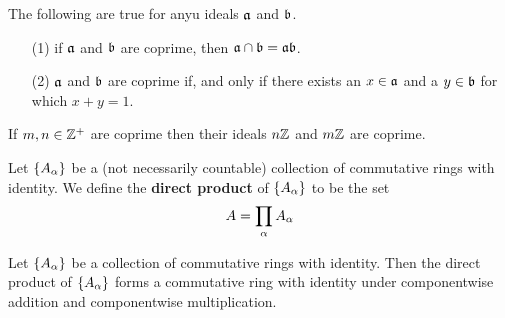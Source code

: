 \begin{lemma}\label{1.9.4}
    The following are true for anyu ideals $\af$ and  $\bf$.
    \begin{enumerate}
        \item[(1)] if $\af$ and $\bf$ are coprime, then $\af \cap \bf=\af\bf$.

        \item[(2)] $\af$ and  $\bf$ are coprime if, and only if there exists an
            $x \in \af$ and a $y \in \bf$ for which $x+y=1$.
    \end{enumerate}
\end{lemma}
\begin{corollary}
    If $m,n \in \Z^+$ are coprime then their ideals $n\Z$ and $m\Z$ are coprime.
\end{corollary}

\begin{definition}
    Let $\{A_\a\}$ be a (not necessarily countable) collection of commutative
    rings with identity. We define the \textbf{direct product} of $\{A_\a\}$ to
    be the set
    \begin{equation*}
        A=\prod_{\a}{A_\a}
    \end{equation*}
\end{definition}

\begin{lemma}\label{1.9.5}
    Let $\{A_\a\}$ be a collection of commutative rings with identity. Then the
    direct product of $\{A_\a\}$ forms a commutative ring with identity under
    componentwise addition and componentwise multiplication.
\end{lemma}

